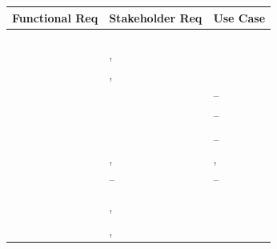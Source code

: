 \documentclass[12pt]{article}
\newcommand{\descriptiveid}[1]{\texttt{\detokenize{#1}}}
\newcommand{\idref}[1]{\hyperref[#1]{\descriptiveid{#1}}}
\newcommand{\srref}[1]{\idref{#1}}
\newcommand{\ucref}[1]{\idref{#1}}
\newcommand{\rref}[1]{\idref{#1}}
\begin{document}
  \begin{longtable}{p{} p{} p{}}

    \toprule
    Functional Req & Stakeholder Req & Use Case \\
    \midrule
    \rref{FR_SupervisorProposal} & \srref{SR_ProposalTemplate} & \ucref{UC_SubmitProposal} \\ \hline
    \rref{FR_ProposalOptionalFields} & \srref{SR_OptionalFields} & \ucref{UC_SubmitProposal} \\ \hline
    \rref{FR_StudentProposal} & \srref{SR_StudentProposals} & \ucref{UC_ProposeOwnProject} \\ \hline
    \rref{FR_ReviewProposal} & \srref{SR_HumanApproval} & \ucref{UC_ReviewProposal} \\ \hline
    \rref{FR_ViewApprovedProjects} & \srref{SR_BrowseProjects}, \srref{SR_SinglePlace} & \ucref{UC_BrowseProjects} \\ \hline
    \rref{FR_ViewProjectStatus} & \srref{SR_BrowseProjects}, \srref{SR_ProjectStatus} & \ucref{UC_BrowseProjects} \\ \hline
    \rref{FR_StudentProfile} & \srref{SR_StudentProfiles} & -- \\ \hline
    \rref{FR_StudentTeams} & \srref{SR_SinglePlace} & -- \\ \hline
    \rref{FR_ValidateTeamRules} & \srref{SR_TeamValidity} & \ucref{UC_ValidateTeams} \\ \hline
    \rref{FR_TeamDiscovery} & \srref{SR_SinglePlace} & -- \\ \hline
    \rref{FR_TeamProfile} & \srref{SR_StudentProfiles}, \srref{SR_TeamContacts} & \ucref{UC_TeamProfile}, \ucref{UC_ViewTeam} \\ \hline
    \rref{FR_TeamRecommend} & -- & -- \\ \hline
    \rref{FR_ProjectInterest} & \srref{SR_SinglePlace} & \ucref{UC_SelectProject} \\ \hline
    \rref{FR_DeclineTeam} & \srref{SR_SinglePlace} & \ucref{UC_SelectProject} \\ \hline
    \rref{FR_ProjectThreads} & \srref{SR_ReviewDialogue}, \srref{SR_SinglePlace} & \ucref{UC_ReviewProposal} \\ \hline
    \rref{FR_ThreadsNotify} & \srref{SR_StatusNotify} & \ucref{UC_NotifyChecklist} \\ \hline
    \rref{FR_RequestApproval} & \srref{SR_ReviewDialogue}, \srref{SR_HumanApproval} & \ucref{UC_ApproveTeamProject} \\ \hline

\end{longtable}
\end{document}
